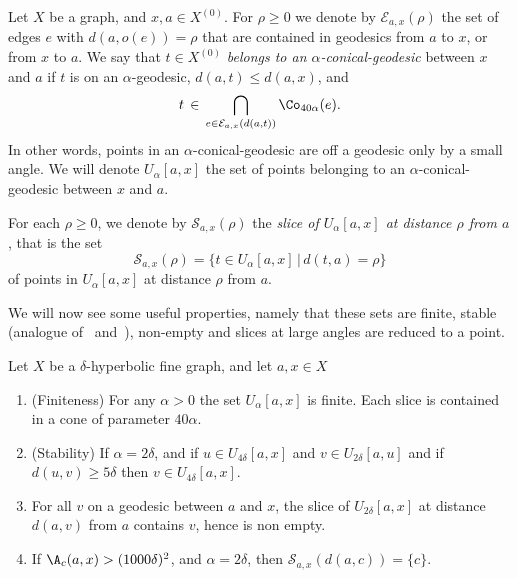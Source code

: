 \goodbreak
\begin{defi}\label{defi;slice}
Let $X$ be a graph, and $x,a\in X^{(0)}$. For $\rho\geq 0$ we denote by $\mathcal{E}_{a,x} (\rho)$ the set of edges $e$ with $d(a,o(e)) = \rho$ that are contained in geodesics from $a$ to $x$, or from $x$ to $a$. We say that $t\in X^{(0)}$ \emph{belongs to an $\alpha$-conical-geodesic} between $x$ and $a$ if $t$ is on an $\alpha$-geodesic, $d(a,t)\leq d(a,x)$, and
\[
t\,\in\, \bigcap_{e\in \mathcal{E}_{a,x}(d(a,t)) }
\Co_{40\alpha} (e).
\]
In other words, points in an $\alpha$-conical-geodesic are off a geodesic only by a small angle. We will denote $U_{\alpha}[a,x]$ the set of points belonging to an $\alpha$-conical-geodesic between $x$ and $a$.

For each $\rho\geq 0$, we denote by $\mathcal{S}_{a,x}(\rho)$ the \emph{slice of $U_{\alpha}[a,x]$ at distance $\rho$ from $a$}, that is the set
\[
\mathcal{S}_{a,x}(\rho)=\{t\in U_{\alpha}[a,x]\,|\,d(t,a)=\rho\}
\]
of points in $U_{\alpha}[a,x]$ at distance $\rho$ from $a$.
\end{defi}

We will now see some useful properties, namely that these sets are finite, stable (analogue of~\cite[3.3]{AL} and~\cite[3.4]{AL}), non-empty and slices at large angles are reduced to a point.

\begin{prop}\label{prop;recap}
Let $X$ be a $\delta$-hyperbolic fine graph, and let $a,x \in X$
\begin{enumerate}
\item (Finiteness)\label{lem;slices_are_finite}
For any $\alpha>0$ the set $U_\alpha[a,x]$ is finite. Each slice is contained in a cone of parameter $40\alpha$.
\item (Stability)\label{lem;stab}
If $\alpha =2\delta$, and if $u\in U_{4\delta}[a,x]$ and $v\in U_{2\delta}[a,u]$ and if $d(u,v)\geq 5\delta$ then $v\in U_{4\delta}[a,x]$.
\item\label{lem;slices_are_nonempty}
For all $v$ on a geodesic between $a$ and $x$, the slice of $ U_{2\delta}[a,x]$ at distance $d(a,v)$ from $a$ contains $v$, hence is non empty.
\item\label{lem;un_goulet_de_slice}
If $\A_c(a,x) >(1000\delta)^2$, and $\alpha =2\delta$, then $\mathcal{S}_{a,x} (d(a,c))= \{c\}$.
\end{enumerate}
\end{prop}

